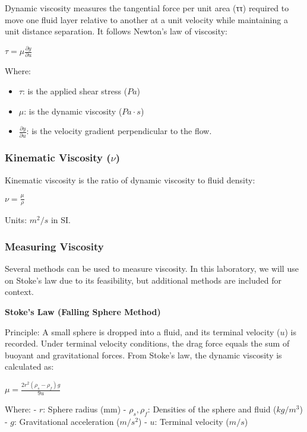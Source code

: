 \documentclass[11pt]{article}
\providecommand{\tightlist}{%
      \setlength{\itemsep}{0pt}\setlength{\parskip}{0pt}}
\begin{document}
Dynamic viscosity measures the tangential force per unit area (ττ)
required to move one fluid layer relative to another at a unit velocity
while maintaining a unit distance separation. It follows Newton's law of
viscosity:

\(\tau = \mu \frac{\partial y}{\partial u}\)

Where:

\begin{itemize}
\tightlist
\item
  \(\tau\): is the applied shear stress (\(Pa\))
\item
  \(\mu\): is the dynamic viscosity (\(Pa \cdot s\))
\item
  \(\frac{\partial y}{\partial u}\): is the velocity gradient
  perpendicular to the flow.
\end{itemize}

\hypertarget{kinematic-viscosity-nu}{%
\subsubsection{\texorpdfstring{Kinematic Viscosity
(\(\nu\))}{Kinematic Viscosity (\textbackslash nu)}}\label{kinematic-viscosity-nu}}

Kinematic viscosity is the ratio of dynamic viscosity to fluid density:

\(\nu = \frac{\mu}{\rho}\)

Units: \(m^2/s\) in SI.

\hypertarget{measuring-viscosity}{%
\subsubsection{Measuring Viscosity}\label{measuring-viscosity}}

Several methods can be used to measure viscosity. In this laboratory, we
will use on Stoke's law due to its feasibility, but additional methods
are included for context.

\textbf{Stoke's Law (Falling Sphere Method)}

Principle: A small sphere is dropped into a fluid, and its terminal
velocity (\(u\)) is recorded. Under terminal velocity conditions, the
drag force equals the sum of buoyant and gravitational forces. From
Stoke's law, the dynamic viscosity is calculated as:

\(\mu=\frac{2r^2(\rho_s−\rho_f)g}{9u}\)

Where: - \(r\): Sphere radius (mm) - \(\rho_s,\rho_f\): Densities of the
sphere and fluid (\(kg/m^3\)) - \(g\): Gravitational acceleration
(\(m/s^2\)) - \(u\): Terminal velocity (\(m/s\))
\end{document}
